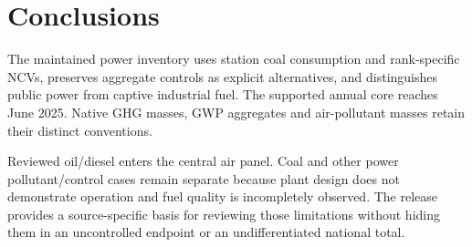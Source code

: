 \section{Conclusions}
\label{sec:conclusion}
The maintained power inventory uses station coal consumption and rank-specific NCVs, preserves aggregate controls as explicit alternatives, and distinguishes public power from captive industrial fuel. The supported annual core reaches June 2025. Native GHG masses, GWP aggregates and air-pollutant masses retain their distinct conventions.

Reviewed oil/diesel \SOtwo{} enters the central air panel. Coal and other power pollutant/control cases remain separate because plant design does not demonstrate operation and fuel quality is incompletely observed. The release provides a source-specific basis for reviewing those limitations without hiding them in an uncontrolled endpoint or an undifferentiated national total.
